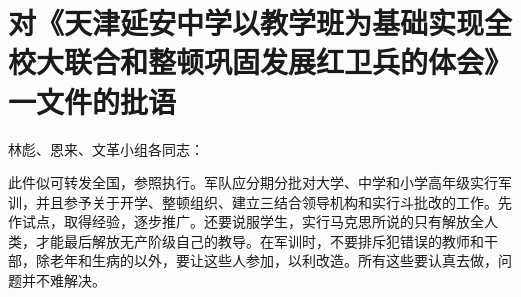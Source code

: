 \section[对《天津延安中学以教学班为基础实现全校大联合和整顿巩固发展红卫兵的体会》一文件的批语（一九六七年三月七日）]{对《天津延安中学以教学班为基础实现全校大联合和整顿巩固发展红卫兵的体会》一文件的批语}


\noindent 林彪、恩来、文革小组各同志：

此件似可转发全国，参照执行。军队应分期分批对大学、中学和小学高年级实行军训，并且参予关于开学、整顿组织、建立三结合领导机构和实行斗批改的工作。先作试点，取得经验，逐步推广。还要说服学生，实行马克思所说的只有解放全人类，才能最后解放无产阶级自己的教导。在军训时，不要排斥犯错误的教师和干部，除老年和生病的以外，要让这些人参加，以利改造。所有这些要认真去做，问题并不难解决。



